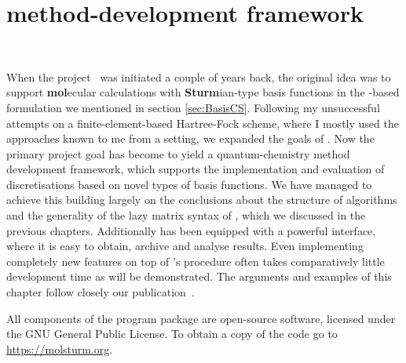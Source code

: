 \chapter{\molsturm method-development framework}
\label{ch:Molsturm}
 \\


\noindent
When the \molsturm project~\cite{molsturmWeb} was initiated a couple of years back,
the original idea was to support \textbf{mol}ecular calculations
with \textbf{Sturm}ian-type basis functions
in the \contraction-based formulation we mentioned in section \vref{sec:BasisCS}.
Following my unsuccessful attempts on a finite-element-based Hartree-Fock scheme,
where I mostly used the approaches known to me from a \cGTO setting,
we expanded the goals of \molsturm.
Now the primary project goal has become to yield a quantum-chemistry
method development framework,
which supports the implementation and evaluation
of discretisations based on novel types of basis functions.
We have managed to achieve this
building largely on the conclusions
about the structure of \SCF algorithms
and the generality of the lazy matrix syntax of \lazyten,
which we discussed in the previous chapters.
Additionally \molsturm has been equipped with a powerful \python interface,
where it is easy to obtain, archive and analyse results.
Even implementing completely new features on top of \molsturm's \SCF procedure
often takes comparatively little development time as will be demonstrated.
The arguments and examples of this chapter follow
closely our publication~\cite{molsturmDesign}.

All components of the \molsturm program package
are open-source software, licensed under the GNU General Public License.
To obtain a copy of the code go to \url{https://molsturm.org}.






